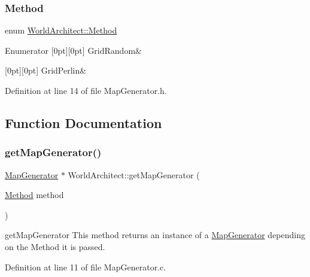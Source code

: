 \subsubsection{\texorpdfstring{Method}{Method}}
{\footnotesize\ttfamily enum \mbox{\hyperlink{namespace_world_architect_a9bb4333e2d555bf42bf7d14ec2a2ae7b}{World\+Architect\+::\+Method}}}

\begin{DoxyEnumFields}{Enumerator}
[0pt][0pt]{}\mbox{\label{namespace_world_architect_a9bb4333e2d555bf42bf7d14ec2a2ae7ba73e5bbdae306a94e7fa95e797dfeb5dd}} 
Grid\+Random&\\
\hline

[0pt][0pt]{}\mbox{\label{namespace_world_architect_a9bb4333e2d555bf42bf7d14ec2a2ae7ba023523cc51ab3633fe50997121f93a44}} 
Grid\+Perlin&\\
\hline

\end{DoxyEnumFields}


Definition at line 14 of file Map\+Generator.\+h.



\subsection{Function Documentation}
\mbox{\label{namespace_world_architect_a984fb538abd7ab5b38bbce0a7bfae707}} 
\subsubsection{\texorpdfstring{getMapGenerator()}{getMapGenerator()}}
{\footnotesize\ttfamily \mbox{\hyperlink{class_world_architect_1_1_map_generator}{Map\+Generator}} $\ast$ World\+Architect\+::get\+Map\+Generator (\begin{DoxyParamCaption}\item[{\mbox{\hyperlink{namespace_world_architect_a9bb4333e2d555bf42bf7d14ec2a2ae7b}{Method}}}]{method }\end{DoxyParamCaption})}

get\+Map\+Generator This method returns an instance of a \mbox{\hyperlink{class_world_architect_1_1_map_generator}{Map\+Generator}} depending on the Method it is passed. 

Definition at line 11 of file Map\+Generator.\+c.

